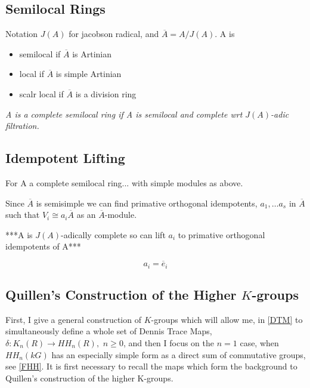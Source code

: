 \subsection{Semilocal Rings}
Notation $J(A)$ for jacobson radical, and $\overline A = A / J(A)$. A is
\begin{itemize}
\item semilocal if $\overline A$ is Artinian
\item local if $\overline A$ is simple Artinian
\item scalr local if $\overline A$ is a division ring
\end{itemize}

\emph{A is a complete semilocal ring if A is semilocal and complete wrt $J(A)$-adic filtration.}
\subsection{Idempotent Lifting}
For A a complete semilocal ring... with simple modules as above.

Since $\overline A$ is semisimple we can find primative orthogonal idempotents, $a_1, \dots a_s$ in $\overline A$ such that $V_i\cong a_i \overline A$ as an $\overline A$-module. 

***A is $J(A)$-adically complete so can lift $a_i$ to primative orthogonal idempotents of A***

$$a_i = \overline e_i$$



\subsection{Quillen's Construction of the Higher $K$-groups\label{Quillen}}

First, I give a general construction of $K$-groups which will allow me, in \ref{DTM} to simultaneously define a whole set of Dennis Trace Maps, $\delta:K_n(R)\rightarrow HH_n(R),\,\,n\geq 0$, and then I focus on the $n=1$ case, when $HH_n(kG)$ has an especially simple form as a direct sum of commutative groups, see \ref{FHH}. It is first necessary to recall the maps which form the background to Quillen's construction of the higher K-groups.

